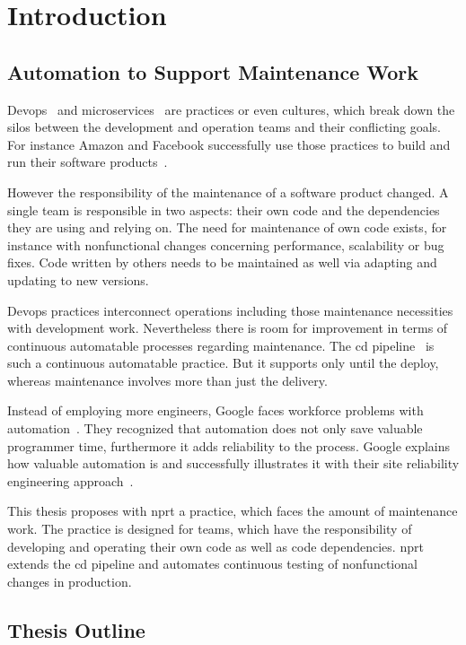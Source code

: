 \chapter{Introduction}
\label{chap:intro}
\section{Automation to Support Maintenance Work}

Devops~\cite{devops_definition} and microservices~\cite{microservices_fowler} are
practices or even cultures, which break down the silos between the development and
operation teams and their conflicting goals. For instance Amazon and Facebook successfully
use those practices to build and run their software products~\cite{build_run,dev_at_fb}.

However the responsibility of the maintenance of a software product changed. A single team
is responsible in two aspects: their own code and the dependencies they are using and
relying on. The need for maintenance of own code exists, for instance with nonfunctional
changes concerning performance, scalability or bug fixes. Code written by others needs to
be maintained as well via adapting and updating to new versions.

Devops practices interconnect operations including those maintenance necessities with
development work. Nevertheless there is room for improvement in terms of continuous
automatable processes regarding maintenance. The \gls{cd}
pipeline~\cite{cd_humble_pipeline} is such a continuous automatable practice. But it
supports only until the deploy, whereas maintenance involves more than just the delivery.

Instead of employing more engineers, Google faces workforce problems with
automation~\cite{sre_automation}. They recognized that automation does not only save
valuable programmer time, furthermore it adds reliability to the process. Google explains
how valuable automation is and successfully illustrates it with their site reliability
engineering approach~\cite{sre_intro}.

This thesis proposes with \gls{nprt} a practice, which faces the amount of maintenance
work. The practice is designed for teams, which have the responsibility of developing and
operating their own code as well as code dependencies. \gls{nprt} extends the \gls{cd}
pipeline and automates continuous testing of nonfunctional changes in production.

\section{Thesis Outline}

